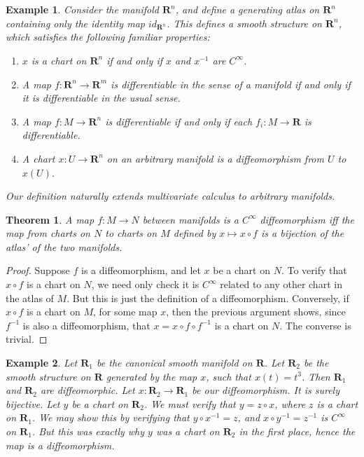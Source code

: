 \documentclass[12pt]{report}
\theoremstyle{plain}
\newtheorem{theorem}{Theorem}[chapter]
\newtheorem*{example}{Example}
\theoremstyle{definition}
\begin{document}
\begin{example}
    Consider the manifold $\mathbf{R}^n$, and define a generating atlas on $\mathbf{R}^n$ containing only the identity map $id_{\mathbf{R}^n}$. This defines a smooth structure on $\mathbf{R}^n$, which satisfies the following familiar properties:
    \begin{enumerate}
        \item $x$ is a chart on $\mathbf{R}^n$ if and only if $x$ and $x^{-1}$ are $C^\infty$.
        \item A map $f:\mathbf{R}^n \to \mathbf{R}^m$ is differentiable in the sense of a manifold if and only if it is differentiable in the usual sense.
        \item A map $f:M \to \mathbf{R}^n$ is differentiable if and only if each $f_i:M \to \mathbf{R}$ is differentiable.
        \item A chart $x:U \to \mathbf{R}^n$ on an arbitrary manifold is a diffeomorphism from $U$ to $x(U)$.
    \end{enumerate}
    Our definition naturally extends multivariate calculus to arbitrary manifolds.
\end{example}

\begin{theorem}
    A map $f:M \to N$ between manifolds is a $C^\infty$ diffeomorphism iff the map from charts on $N$ to charts on $M$ defined by $x \mapsto x \circ f$ is a bijection of the atlas' of the two manifolds.
\end{theorem}
\begin{proof}
    Suppose $f$ is a diffeomorphism, and let $x$ be a chart on $N$. To verify that $x \circ f$ is a chart on $N$, we need only check it is $C^\infty$ related to any other chart in the atlas of $M$. But this is just the definition of a diffeomorphism. Conversely, if $x \circ f$ is a chart on $M$, for some map $x$, then the previous argument shows, since $f^{-1}$ is also a diffeomorphism, that $x = x \circ f \circ f^{-1}$ is a chart on $N$. The converse is trivial.
\end{proof}

\begin{example}
    Let $\mathbf{R}_1$ be the canonical smooth manifold on $\mathbf{R}$. Let $\mathbf{R}_2$ be the smooth structure on $\mathbf{R}$ generated by the map $x$, such that $x(t) = t^3$. Then $\mathbf{R}_1$ and $\mathbf{R}_2$ are diffeomorphic. Let $x:\mathbf{R}_2 \to \mathbf{R}_1$ be our diffeomorphism. It is surely bijective. Let $y$ be a chart on $\mathbf{R}_2$. We must verify that $y = z \circ x$, where $z$ is a chart on $\mathbf{R}_1$. We may show this by verifying that $y \circ x^{-1} = z$, and $x \circ y^{-1} = z^{-1}$ is $C^\infty$ on $\mathbf{R}_1$. But this was exactly why $y$ was a chart on $\mathbf{R}_2$ in the first place, hence the map is a diffeomorphism.
\end{example}
\end{document}
